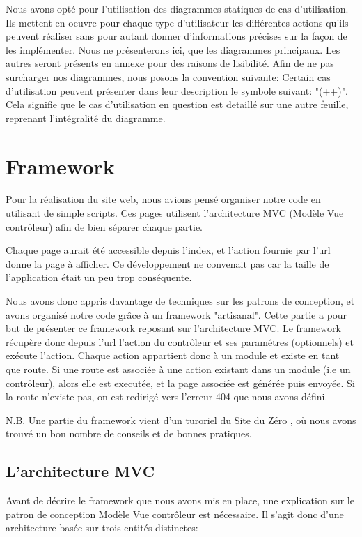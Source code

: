 Nous avons opté pour l'utilisation des diagrammes statiques de cas d'utilisation. Ils mettent en oeuvre pour chaque type d'utilisateur les différentes actions qu'ils peuvent réaliser sans pour autant donner d'informations précises sur la façon de les implémenter.
Nous ne présenterons ici, que les diagrammes principaux. Les autres seront présents en annexe pour des raisons de lisibilité.
Afin de ne pas surcharger nos diagrammes, nous posons la convention suivante: Certain cas d'utilisation peuvent présenter 
dans leur description le symbole suivant: "(++)". Cela signifie que le cas d'utilisation en question est detaillé sur une autre feuille, reprenant l'intégralité du diagramme.

 
    \section{Framework}
Pour la réalisation du site web, nous avions pensé organiser notre code en utilisant de simple scripts.
Ces pages utilisent l'architecture MVC (Modèle Vue contrôleur) afin de bien séparer chaque partie.

Chaque page aurait été accessible depuis l'index, et l'action fournie par l'url donne la page à afficher.
Ce développement ne convenait pas car la taille de l'application était un peu trop conséquente.

Nous avons donc appris davantage de techniques sur les patrons de conception, et avons organisé notre code
grâce à un framework "artisanal". Cette partie a pour but de présenter ce framework reposant sur l'architecture MVC.
Le framework récupère donc depuis l'url l'action du contrôleur et ses paramétres (optionnels) et exécute l'action.
Chaque action appartient donc à un module et existe en tant que route. Si une route est associée à une action existant dans
un module (i.e un contrôleur), alors elle est executée, et la page associée est générée puis envoyée.
Si la route n'existe pas, on est redirigé vers l'erreur 404 que nous avons défini.

N.B. Une partie du framework vient d'un turoriel du Site du Zéro \cite{ref_framework_mvc}, 
où nous avons trouvé un bon nombre de conseils et de bonnes pratiques.

        \subsection{L'architecture MVC}
Avant de décrire le framework que nous avons mis en place, une explication sur le patron de conception Modèle Vue contrôleur
est nécessaire. Il s'agit donc d'une architecture basée sur trois entités distinctes:

